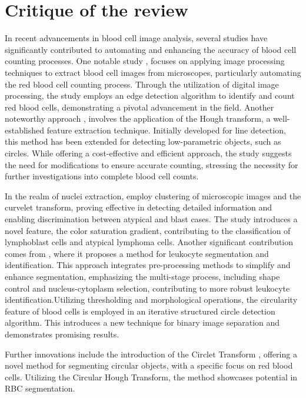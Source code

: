 \section{Critique of the review} %
In recent advancements in blood cell image analysis, several studies have significantly contributed to automating and enhancing the accuracy of blood cell counting processes. One notable study \cite{alomari2014automatic}, focuses on applying image processing techniques to extract blood cell images from microscopes, particularly automating the red blood cell counting process. Through the utilization of digital image processing, the study employs an edge detection algorithm to identify and count red blood cells, demonstrating a pivotal advancement in the field. Another noteworthy approach \cite{maitra2012detection}, involves the application of the Hough transform, a well-established feature extraction technique. Initially developed for line detection, this method has been extended for detecting low-parametric objects, such as circles. While offering a cost-effective and efficient approach, the study suggests the need for modifications to ensure accurate counting, stressing the necessity for further investigations into complete blood cell counts.

In the realm of nuclei extraction, \cite{poomcokrak2008red} employ clustering of microscopic images and the curvelet transform, proving effective in detecting detailed information and enabling discrimination between atypical and blast cases. The study introduces a novel feature, the color saturation gradient, contributing to the classification of lymphoblast cells and atypical lymphoma cells. Another significant contribution comes from \cite{putzu2013white}, where it proposes a method for leukocyte segmentation and identification. This approach integrates pre-processing methods to simplify and enhance segmentation, emphasizing the multi-stage process, including shape control and nucleus-cytoplasm selection, contributing to more robust leukocyte identification.Utilizing thresholding and morphological operations, the circularity feature \cite{sarrafzadeh2015circlet} of blood cells is employed in an iterative structured circle detection algorithm. This introduces a new technique for binary image separation and demonstrates promising results.

Further innovations include the introduction of the Circlet Transform \cite{soltanzadeh2012extraction}, offering a novel method for segmenting circular objects, with a specific focus on red blood cells. Utilizing the Circular Hough Transform, the method showcases potential in RBC segmentation.

